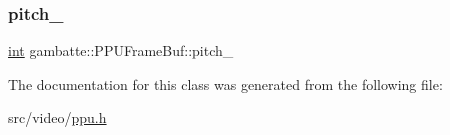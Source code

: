 \mbox{\label{classgambatte_1_1PPUFrameBuf_aa0961f70dd373c63c5c4e95fb14b20e5}} 
\subsubsection{\texorpdfstring{pitch\+\_\+}{pitch\_}}
{\footnotesize\ttfamily \hyperlink{ioapi_8h_a787fa3cf048117ba7123753c1e74fcd6}{int} gambatte\+::\+P\+P\+U\+Frame\+Buf\+::pitch\+\_\+\hspace{0.3cm}{\ttfamily [private]}}



The documentation for this class was generated from the following file\+:\begin{DoxyCompactItemize}
\item 
src/video/\hyperlink{ppu_8h}{ppu.\+h}\end{DoxyCompactItemize}
